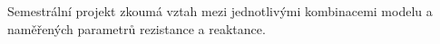 Semestrální projekt zkoumá vztah mezi jednotlivými kombinacemi modelu a naměřených parametrů rezistance a reaktance.